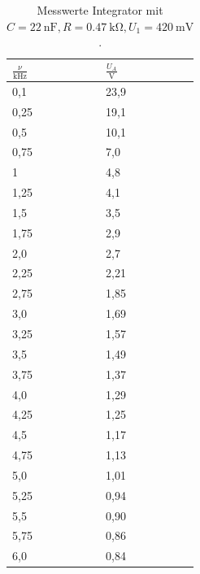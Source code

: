 \documentclass{scrartcl}
\begin{document}
\begin{table}
\centering
\begin{tabular}{p{2cm}|p{2cm}}

	$\frac{\nu}{\si{\kilo \hertz}}$ & $\frac{U_A}{\si{\volt}}$ \\

\toprule
0,1 & 23,9  \\
0,25 & 19,1  \\
0,5 & 10,1 \\
0,75 & 7,0 \\
1 & 4,8  \\
1,25 & 4,1 \\
1,5 & 3,5 \\
1,75 & 2,9 \\
2,0 & 2,7 \\
2,25 & 2,21 \\
2,75 & 1,85 \\
3,0 & 1,69 \\
3,25 & 1,57 \\
3,5 & 1,49 \\
3,75 & 1,37 \\
4,0 & 1,29 \\
4,25 & 1,25 \\
4,5 & 1,17 \\
4,75 & 1,13 \\
5,0 & 1,01 \\
5,25 & 0,94 \\
5,5 & 0,90 \\
5,75 & 0,86 \\
6,0 & 0,84 \\

\bottomrule
\end{tabular}
\caption{Messwerte Integrator mit $C=\SI{22}{\nano \farad},R=\SI{0,47}{\kilo \ohm},U_1=\SI{420}{\milli \volt}$.}
\label{tab:int}
\end{table}
\end{document}
